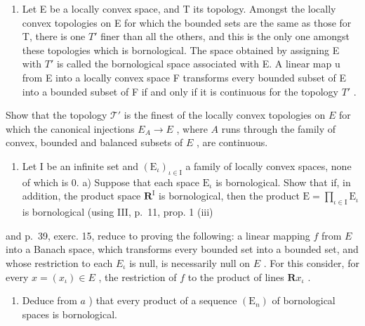 \exercisegroup

\begin{enumerate}
\def\labelenumi{\arabic{enumi})}
\tightlist
\item
  Let E be a locally convex space, and T its topology. Amongst the locally convex topologies on E for which the bounded sets are the same as those for T, there is one \(T'\) finer than all the others, and this is the only one amongst these topologies which is bornological. The space obtained by assigning E with \(T'\) is called the bornological space associated with E. A linear map u from E into a locally convex space F transforms every bounded subset of E into a bounded subset of F if and only if it is continuous for the topology \(T'\) .
\end{enumerate}

Show that the topology \(\mathcal{T}'\) is the finest of the locally convex topologies on \(E\) for which the canonical injections \(E_A \to E\) , where \(A\) runs through the family of convex, bounded and balanced subsets of \(E\) , are continuous.

\begin{enumerate}
\def\labelenumi{\arabic{enumi})}
\setcounter{enumi}{1}
\tightlist
\item
  Let I be an infinite set and \((\mathrm{E}_{\iota})_{\iota \in \mathrm{I}}\) a family of locally convex spaces, none of which is 0. a) Suppose that each space \(\mathrm{E}_{\iota}\) is bornological. Show that if, in addition, the product space \(\mathbf{R}^{\mathrm{I}}\) is bornological, then the product \(\mathrm{E} = \prod_{\iota \in \mathrm{I}}\mathrm{E}_{\iota}\) is bornological (using III, p.~11, prop. 1 (iii)
\end{enumerate}

and p.~39, exerc. 15, reduce to proving the following: a linear mapping \(f\) from \(E\) into a Banach space, which transforms every bounded set into a bounded set, and whose restriction to each \(E_{\iota}\) is null, is necessarily null on \(E\) . For this consider, for every \(x = (x_{\iota}) \in E\) , the restriction of \(f\) to the product of lines \(\mathbf{R}x_{\iota}\) .

\begin{enumerate}
\def\labelenumi{\alph{enumi})}
\setcounter{enumi}{1}
\tightlist
\item
  Deduce from \(a\) ) that every product of a sequence \((\mathrm{E}_n)\) of bornological spaces is bornological.
\end{enumerate}

